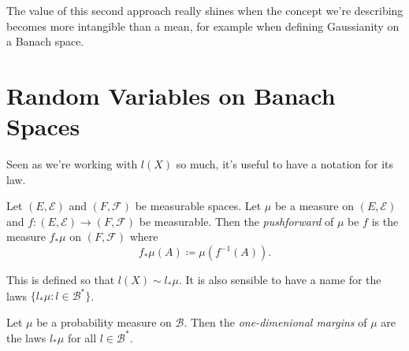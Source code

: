 \documentclass[fontsize=12pt, DIV=10]{scrreprt}
\theoremstyle{remark}
\newcommand{\defeq}{\coloneqq}
\newcommand{\calB}{\mathcal B}
\newcommand{\calE}{\mathcal E}
\newcommand{\calF}{\mathcal F}
\begin{document}
The value of this second approach really shines when the concept we're describing becomes more intangible than a mean, for example when defining Gaussianity on a Banach space.

\section{Random Variables on Banach Spaces}


Seen as we're working with $l(X)$ so much, it's useful to have a notation for its law.
\begin{defn}
	Let $(E, \calE)$ and $(F, \calF)$ be measurable spaces. Let $\mu$ be a measure on $(E, \calE)$ and $f: (E, \calE) \to (F, \calF)$ be measurable. Then the \emph{pushforward} of $\mu$ be $f$ is the measure $f_* \mu$ on $(F, \calF)$ where
	\begin{equation}
		f_* \mu(A) \defeq \mu(f^{-1}(A)).
	\end{equation}
\end{defn}

This is defined so that $l(X) \sim l_* \mu$. It is also sensible to have a name for the laws $\{l_* \mu : l \in \calB^*\}$.
\begin{defn}
	Let $\mu$ be a probability measure on $\calB$. Then the \emph{one-dimenional margins} of $\mu$ are the laws $l_* \mu$ for all $l \in \calB^*$.
\end{defn}
\end{document}
